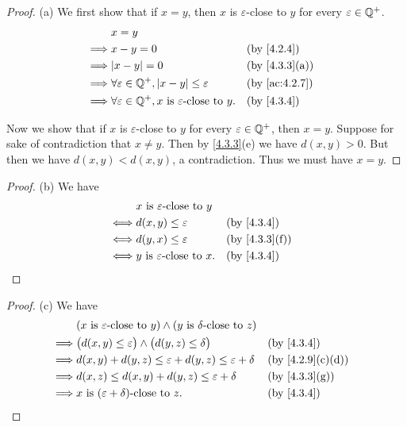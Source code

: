\begin{proof}{(a)}
  We first show that if \(x = y\), then \(x\) is \(\varepsilon\)-close to \(y\) for every \(\varepsilon \in \mathbb{Q}^+\).
  \begin{align*}
             & x = y                                                                                                    \\
    \implies & x - y = 0                                                               &  & \text{(by \cref{4.2.4})}    \\
    \implies & \abs{x - y} = 0                                                         &  & \text{(by \cref{4.3.3}(a))} \\
    \implies & \forall \varepsilon \in \Q^+, \abs{x - y} \leq \varepsilon              &  & \text{(by \cref{ac:4.2.7})} \\
    \implies & \forall \varepsilon \in \Q^+, x \text{ is \(\varepsilon\)-close to } y. &  & \text{(by \cref{4.3.4})}
  \end{align*}

  Now we show that if \(x\) is \(\varepsilon\)-close to \(y\) for every \(\varepsilon \in \mathbb{Q}^+\), then \(x = y\).
  Suppose for sake of contradiction that \(x \neq y\).
  Then by \cref{4.3.3}(e) we have \(d(x, y) > 0\).
  But then we have \(d(x, y) < d(x, y)\), a contradiction.
  Thus we must have \(x = y\).
\end{proof}

\begin{proof}{(b)}
  We have
  \begin{align*}
         & x \text{ is \(\varepsilon\)-close to } y                                   \\
    \iff & d(x, y) \leq \varepsilon                  &  & \text{(by \cref{4.3.4})}    \\
    \iff & d(y, x) \leq \varepsilon                  &  & \text{(by \cref{4.3.3}(f))} \\
    \iff & y \text{ is \(\varepsilon\)-close to } x. &  & \text{(by \cref{4.3.4})}
  \end{align*}
\end{proof}

\begin{proof}{(c)}
  We have
  \begin{align*}
             & (x \text{ is \(\varepsilon\)-close to } y) \land (y \text{ is \(\delta\)-close to } z)                                     \\
    \implies & \big(d(x, y) \leq \varepsilon\big) \land \big(d(y, z) \leq \delta\big)                 &  & \text{(by \cref{4.3.4})}       \\
    \implies & d(x, y) + d(y, z) \leq \varepsilon + d(y, z) \leq \varepsilon + \delta                 &  & \text{(by \cref{4.2.9}(c)(d))} \\
    \implies & d(x, z) \leq d(x, y) + d(y, z) \leq \varepsilon + \delta                               &  & \text{(by \cref{4.3.3}(g))}    \\
    \implies & x \text{ is \((\varepsilon + \delta)\)-close to } z.                                   &  & \text{(by \cref{4.3.4})}
  \end{align*}
\end{proof}

